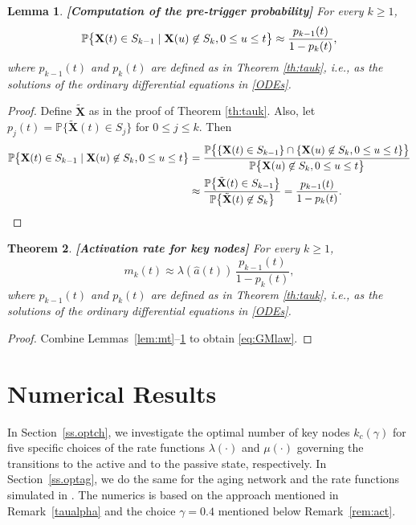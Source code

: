 \documentclass[11pt]{article}
\newtheorem{Theorem}{Theorem}[section]
\newtheorem{Lemma}[Theorem]{Lemma}
\numberwithin{equation}{section}
\newcommand{\X}{\mathbf{X}}
\renewcommand{\P}{\mathbb{P}}
\begin{document}
\begin{Lemma}{\bf [Computation of the pre-trigger probability]}
\label{lem:a2}
For every $k \geq 1$,
\[
\mathbb{P}\big\{{\bf X}(t) \in S_{k-1} \mid {\bf X}(u) \not \in S_{k}, 0 \leq u \leq t \big\}
\approx \frac{p_{k-1}(t)}{1-p_{k}(t)},
\]
where $p_{k-1}(t)$ and $p_{k}(t)$ are defined as in Theorem \ref{th:tauk}, i.e., as the solutions of the ordinary differential equations in \eqref{ODEs}.
\end{Lemma}

\begin{proof}
Define $\tilde{\mathbf{X}}$ as in the proof of Theorem \ref{th:tauk}. Also, let $p_{j}(t)=\P\{\tilde{\X}(t)\in S_{j}\}$ for $0\leq j\leq k$. Then
\begin{align*}
\mathbb{P}\big\{{\bf X}(t) \in S_{k-1} \mid {\bf X}(u) \not \in S_{k}, 0 \leq u \leq t \big\}
&=\dfrac{\mathbb{P}\big\{\{{\bf X}(t) \in S_{k-1}\}\cap\{{\bf X}(u) \not \in S_{k}, 0 \leq u \leq t \}\big\}}{\mathbb{P}\big\{{\bf X}(u) \not \in S_{k}, 0 \leq u \leq t \big\}}\\&
\approx\dfrac{\mathbb{P}\big\{\tilde{\X}(t) \in S_{k-1}\big\}}{\mathbb{P}\big\{\tilde{\X}(t) \not \in S_{k} \big\}}= \frac{p_{k-1}(t)}{1-p_{k}(t)}.
\end{align*}
\end{proof}

\begin{Theorem}{\bf [Activation rate for key nodes]}
\label{th:Glaw}
For every $k \geq 1$,
\begin{equation}
\label{eq:GMlaw}
m_{k}(t) \approx \lambda(\hat{a}(t))\,\frac{p_{k-1}(t)}{1-p_{k}(t)},
\end{equation}
where $p_{k-1}(t)$ and $p_{k}(t)$ are defined as in Theorem \ref{th:tauk}, i.e., as the solutions of the ordinary differential equations in \eqref{ODEs}.
\end{Theorem}

\begin{proof}
Combine Lemmas~\ref{lem:mt}--\ref{lem:a2} to obtain \eqref{eq:GMlaw}.
\end{proof}




\section{Numerical Results}
\label{s.numerics}

In Section~\ref{ss.optch}, we investigate the optimal number of key nodes $k_c(\gamma)$ for five specific choices of the rate functions $\lambda(\cdot)$ and $\mu(\cdot)$ governing the transitions to the active and to the passive state, respectively. In Section~\ref{ss.optag}, we do the same for the aging network and the rate functions simulated in \cite{MRFR2017}. The numerics is based on the approach mentioned in Remark~\ref{taualpha} and the choice $\gamma=0.4$ mentioned below Remark~\ref{rem:act}.
\end{document}
